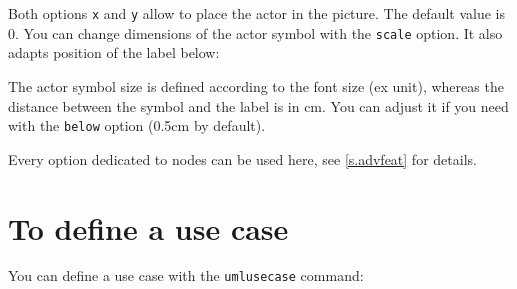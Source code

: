 \documentclass[a4paper,11pt]{report}
\begin{document}
\medskip

Both options {\tt x} and {\tt y} allow to place the actor in the picture. The default value is 0. You can change dimensions of the actor symbol with the {\tt scale} option. It also adapts position of the label below:

\medskip

\begin{minipage}{0.5\textwidth}
	
\end{minipage}
\begin{minipage}{0.5\textwidth}
	\begin{center}
	\end{center}
\end{minipage}

\medskip

The actor symbol size is defined according to the font size (ex unit), whereas the distance between the symbol and the label is in cm. You can adjust it if you need with the {\tt below} option (0.5cm by default).

\medskip

\begin{minipage}{0.5\textwidth}
	
\end{minipage}
\begin{minipage}{0.5\textwidth}
	\begin{center}
	\end{center}
\end{minipage}

Every \TikZ{} option dedicated to nodes can be used here, see \autoref{s.advfeat} for details.

\section{To define a use case}\label{s.usecase}

You can define a use case with the {\tt umlusecase} command:

\medskip

\begin{minipage}{0.5\textwidth}
	
\end{minipage}
\begin{minipage}{0.5\textwidth}
	\begin{center}
	\end{center}
\end{minipage}
\end{document}

